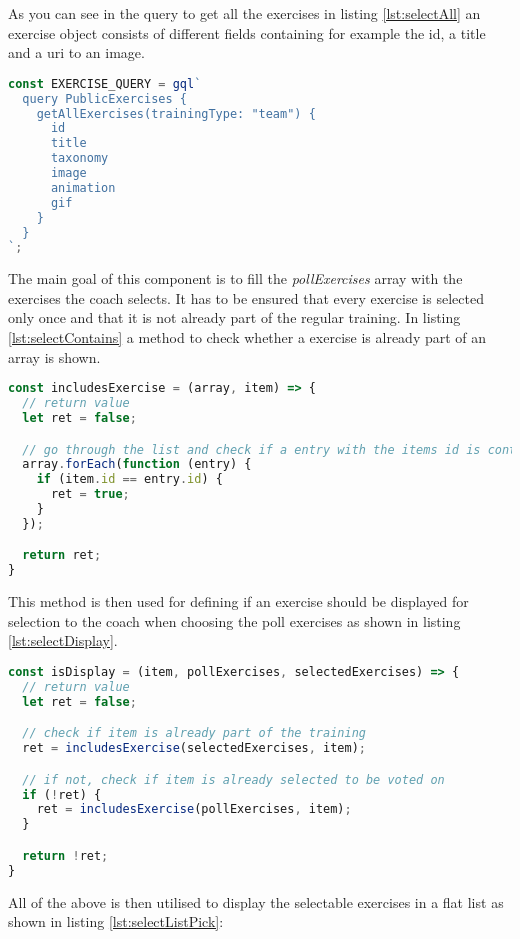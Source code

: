 As you can see in the query to get all the exercises in listing \ref{lst:selectAll} an exercise object consists of different fields containing for example the id, a title and a uri to an image.

\begin{lstlisting}[language=javascript, caption=\textit{GraphQL} Query AllExercises, label=lst:selectAll]
const EXERCISE_QUERY = gql`
  query PublicExercises {
    getAllExercises(trainingType: "team") {
      id
      title
      taxonomy
      image
      animation
      gif
    }
  }
`;
\end{lstlisting}

The main goal of this component is to fill the \textit{pollExercises} array with the exercises the coach selects. It has to be ensured that every exercise is selected only once and that it is not already part of the regular training. In listing \ref{lst:selectContains} a method to check whether a exercise is already part of an array is shown.

\begin{lstlisting}[language=javascript, caption=Check Include Method, label=lst:selectContains]
const includesExercise = (array, item) => {
  // return value
  let ret = false;

  // go through the list and check if a entry with the items id is contained
  array.forEach(function (entry) {
    if (item.id == entry.id) {
      ret = true;
    }
  });

  return ret;
}
\end{lstlisting}

This method is then used for defining if an exercise should be displayed for selection to the coach when choosing the poll exercises as shown in listing \ref{lst:selectDisplay}.

\begin{lstlisting}[language=javascript, caption=Display Exercise Method, label=lst:selectDisplay]
const isDisplay = (item, pollExercises, selectedExercises) => {
  // return value
  let ret = false;

  // check if item is already part of the training
  ret = includesExercise(selectedExercises, item);

  // if not, check if item is already selected to be voted on
  if (!ret) {
    ret = includesExercise(pollExercises, item);
  }

  return !ret;
}
\end{lstlisting}

All of the above is then utilised to display the selectable exercises in a flat list as shown in listing \ref{lst:selectListPick}:

